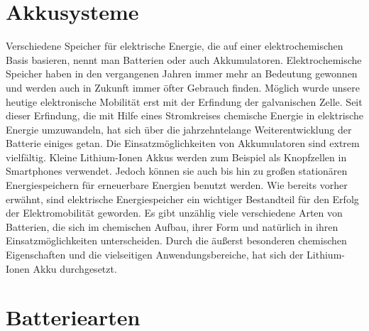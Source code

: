 
\section{Akkusysteme}
Verschiedene Speicher für elektrische Energie, die auf einer elektrochemischen Basis basieren, nennt man Batterien oder auch Akkumulatoren. Elektrochemische Speicher haben in den vergangenen Jahren immer mehr an Bedeutung gewonnen und werden auch in Zukunft immer öfter Gebrauch finden. Möglich wurde unsere heutige elektronische Mobilität erst mit der Erfindung der galvanischen Zelle. Seit dieser Erfindung, die mit Hilfe eines Stromkreises chemische Energie in elektrische Energie umzuwandeln, hat sich über die jahrzehntelange Weiterentwicklung der Batterie einiges getan. Die Einsatzmöglichkeiten von Akkumulatoren sind extrem vielfältig. Kleine Lithium-Ionen Akkus werden zum Beispiel als Knopfzellen in Smartphones verwendet. Jedoch können sie auch bis hin zu großen stationären Energiespeichern für erneuerbare Energien benutzt werden. Wie bereits vorher erwähnt, sind elektrische Energiespeicher ein wichtiger Bestandteil für den Erfolg der Elektromobilität geworden. Es gibt unzählig viele verschiedene Arten von Batterien, die sich im chemischen Aufbau, ihrer Form und natürlich in ihren Einsatzmöglichkeiten unterscheiden. Durch die äußerst besonderen chemischen Eigenschaften und die vielseitigen Anwendungsbereiche, hat sich der Lithium-Ionen Akku durchgesetzt.
\newpage

\section{Batteriearten}

